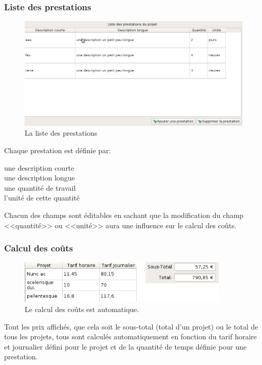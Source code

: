\subsubsection{Liste des prestations}
\begin{figure}[H]
	\centering
	\includegraphics[width=12cm]{screens/listePrestations.png}
	\caption{La liste des prestations}
	\label{fig:prestation_list}
\end{figure}
Chaque prestation est définie par:
\begin{description}
	\item[une description courte]
	\item[une description longue]
	\item[une quantité de travail]
	\item[l'unité de cette quantité]
\end{description}
Chacun des champs sont éditables en sachant que la modification du champ <<quantité>> ou <<unité>> aura une influence sur le calcul des coûts.

\subsubsection{Calcul des coûts}
\begin{figure}[H]
	\centering
	\includegraphics[width=10cm]{screens/calculCouts.png}
	\caption{Le calcul des coûts est automatique.}
	\label{fig:compute_costs}
\end{figure}
Tout les prix
affichés, que cela soit le sous-total (total d’un projet) ou le total de tous les projets, tous sont
calculés automatiquement en fonction du tarif horaire et journalier défini pour le projet et de la
quantité de temps définie pour une prestation.

